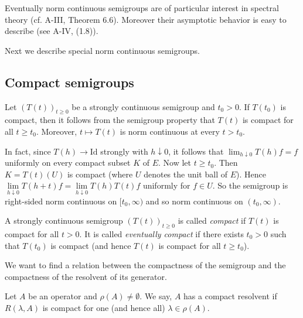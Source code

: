 Eventually norm continuous semigroups are of particular interest in spectral theory (cf. A-III, Theorem 6.6).
Moreover their asymptotic behavior is easy to describe (see A-IV, (1.8)).

Next we describe special norm continuous semigroups.
\subsection{Compact semigroups} \label{subsec:a2-1.se7}%
Let $(T(t))_{t\geq 0}$ be a strongly continuous semigroup and $t_0 > 0$.
If $T(t_0)$ is compact, then it follows from the semigroup property that $T(t)$ is compact for all $t \geq t_0$.
Moreover, $t \mapsto T(t)$ is norm continuous at every $t > t_0$.

In fact, since $T(h) \to \text{Id}$ strongly with $h \downarrow 0$, it follows that $\lim_{h \downarrow 0} T(h)f = f$ uniformly on every compact subset $K$ of $E$.
Now let $t \geq t_0$.
Then $K = T(t)(U)$ is compact (where $U$ denotes the unit ball of $E$).
Hence $\lim \limits_{h \downarrow 0} T(h+t)f = \lim \limits_{h \downarrow 0} T(h)T(t)f$ uniformly for $f \in U$.
So the semigroup is right-sided norm continuous on $[t_0,\infty)$ and so norm continuous on $(t_0,\infty)$.

\begin{definition}\label{def:a2-1.22}
A strongly continuous semigroup $(T(t))_{t\geq 0}$ is called \emph{compact} if $T(t)$ is compact for all $t > 0$. It is called \emph{eventually compact} if there exists $t_0 > 0$ such that $T(t_0)$ is compact (and hence $T(t)$ is compact for all $t \geq t_0$).
\end{definition}

We want to find a relation between the compactness of the semigroup and the compactness of the resolvent of its generator.

\begin{definition}\label{def:a2-1.23}

Let $A$ be an operator and $\rho(A) \neq \emptyset$.
We say, $A$ has a compact resolvent if $R(\lambda,A)$ is compact for one (and hence all) $\lambda \in \rho(A)$.
\end{definition}

